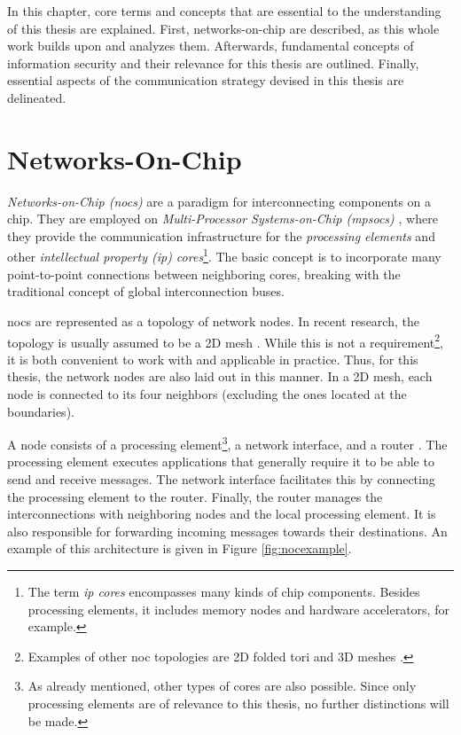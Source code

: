 In this chapter, core terms and concepts that are essential to the understanding of this thesis are explained. First, networks-on-chip are
described, as this whole work builds upon and analyzes them. Afterwards, fundamental concepts of information security and their relevance for this
thesis are outlined. Finally, essential aspects of the communication strategy devised in this thesis are delineated.

\section{Networks-On-Chip}\label{sec:networkonchipfun}
\textit{Networks-on-Chip (\glspl{noc})} are a paradigm for interconnecting components on a chip. They are employed on
\textit{Multi-Processor Systems-on-Chip (\glspl{mpsoc})} \cites(e.g.)(){ivanov05nocintroduction}{biswas15routerattack}{tatas16designingnocs}, where they
provide the communication infrastructure for the \textit{processing elements} and other \textit{intellectual property (\gls{ip}) cores}\footnote{The
term \textit{\gls{ip} cores} encompasses many kinds of chip components. Besides processing elements, it includes memory nodes and hardware
accelerators, for example.}. The basic concept is to incorporate many point-to-point connections between neighboring cores, breaking with the traditional
concept of global interconnection buses.

\glspl{noc} are represented as a topology of network nodes. In recent research, the topology is usually assumed to be a 2D mesh
\cites(e.g.)(){frey17hardenednoc}{kumar02networkonchip}{fernandes16nocrouting}{boraten16packetsecurity}. While this is not a
requirement\footnote{Examples of other \gls{noc} topologies are 2D folded tori and 3D meshes \cite[2]{feero07noc3d}.}, it is both convenient
to work with and applicable in practice. Thus, for this thesis, the network nodes are also laid out in this manner.
In a 2D mesh, each node is connected to its four neighbors (excluding the ones located at the boundaries).

A node consists of a processing element\footnote{As already mentioned, other types of cores are also possible. Since only processing elements are of
relevance to this thesis, no further distinctions will be made.}, a network interface, and a router \cite{dally01routepacketsnotwires}. The processing
element executes applications that generally require it to be able to send and receive messages. The network interface facilitates this by connecting the
processing element to the router. Finally, the router manages the interconnections with neighboring nodes and the local processing element. It is also
responsible for forwarding incoming messages towards their destinations. An example of this architecture is given in Figure \vref{fig:nocexample}.

